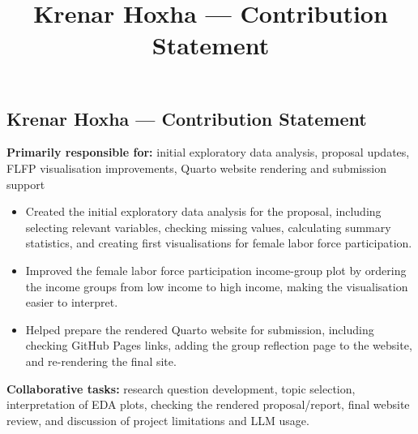 \documentclass[
  letterpaper,
  DIV=11,
  numbers=noendperiod]{scrartcl}
\title{Krenar Hoxha --- Contribution Statement}
\author{}
\date{}
\providecommand{\tightlist}{%
  \setlength{\itemsep}{0pt}\setlength{\parskip}{0pt}}
\begin{document}
\maketitle


\subsection{Krenar Hoxha --- Contribution
Statement}\label{krenar-hoxha-contribution-statement}

\textbf{Primarily responsible for:} initial exploratory data analysis,
proposal updates, FLFP visualisation improvements, Quarto website
rendering and submission support

\begin{itemize}
\tightlist
\item
  Created the initial exploratory data analysis for the proposal,
  including selecting relevant variables, checking missing values,
  calculating summary statistics, and creating first visualisations for
  female labor force participation.
\item
  Improved the female labor force participation income-group plot by
  ordering the income groups from low income to high income, making the
  visualisation easier to interpret.
\item
  Helped prepare the rendered Quarto website for submission, including
  checking GitHub Pages links, adding the group reflection page to the
  website, and re-rendering the final site.
\end{itemize}

\textbf{Collaborative tasks:} research question development, topic
selection, interpretation of EDA plots, checking the rendered
proposal/report, final website review, and discussion of project
limitations and LLM usage.
\end{document}
